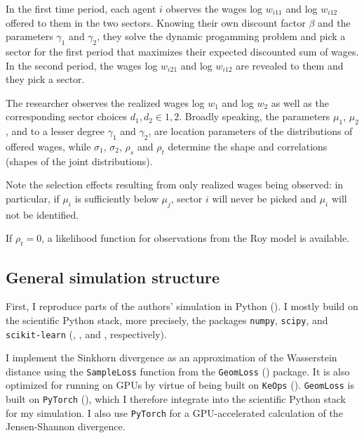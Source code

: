 In the first time period, each agent $i$ observes the wages log $w_{i11}$ and log $w_{i12}$ offered to them in the two sectors.
Knowing their own discount factor $\beta$ and the parameters $\gamma_1$ and $\gamma_2$, they solve the dynamic progamming problem
and pick a sector for the first period that maximizes their expected discounted sum of wages.
In the second period, the wages log $w_{i21}$ and log $w_{i12}$ are revealed to them and they pick a sector. %

The researcher observes the realized wages log $w_1$ and log $w_2$ as well as the corresponding sector choices $d_1, d_2 \in {1, 2}$.
Broadly speaking, the parameters $\mu_1$, $\mu_2$, and to a lesser degree $\gamma_1$ and $\gamma_2$, are location parameters of the distributions of offered wages,
while $\sigma_1$, $\sigma_2$, $\rho_s$ and $\rho_t$ determine the shape and correlations (shapes of the joint distributions). %

Note the selection effects resulting from only realized wages being observed:
in particular, if $\mu_i$ is sufficiently below $\mu_j$, sector $i$ will never be picked and $\mu_i$ will not be identified.

If $\rho_t = 0$, a likelihood function for observations from the Roy model is available.

\subsection{General simulation structure}
\label{sec:general_simulation_structure}

First, I reproduce parts of the authors' simulation in Python (\textcite{Python:3.12}).
I mostly build on the scientific Python stack, more precisely, the packages \texttt{numpy}, \texttt{scipy}, and \texttt{scikit-learn} (\textcite{harris2020array}, \textcite{2020SciPy-NMeth}, and \textcite{scikit-learn}, respectively).

I implement the Sinkhorn divergence as an approximation of the Wasserstein distance using the \texttt{SampleLoss} function from the \texttt{GeomLoss} (\cite{feydy2019interpolating}) package.
It is also optimized for running on GPUs by virtue of being built on \texttt{KeOps} (\cite{KeOps}).
\texttt{GeomLoss} is built on \texttt{PyTorch} (\cite{Ansel_PyTorch_2_Faster_2024}), which I therefore integrate into the scientific Python stack for my simulation.
I also use \texttt{PyTorch} for a GPU-accelerated calculation of the Jensen-Shannon divergence. %

